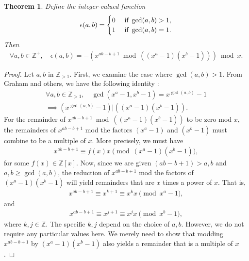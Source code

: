 \documentclass{article}
\theoremstyle{plain}
\newtheorem{theorem}{Theorem}
\theoremstyle{definition}
\newcommand{\coprime}{\epsilon}
\newcommand{\Z}{\mathbb{Z}}
\begin{document}
\begin{theorem} \label{proof:coprimalityfunctionpoly}
Define the integer-valued function
\begin{align*}
\coprime(a,b) =
\begin{cases}
    0 & \textup{ if } \gcd(a,b) > 1 , \\
    1 & \textup{ if } \gcd(a,b) = 1 .
\end{cases}
\end{align*}
Then
\begin{align*}
\forall a,b \in \Z^+, \quad
\coprime(a,b) = -\left(x^{ab-b+1} \bmod \left((x^a-1)(x^b-1)\right)\right) \bmod x .
\end{align*}
\end{theorem}
\begin{proof}
Let $a,b$ in $\Z_{>1}$. First, we examine the case where $\gcd(a,b) > 1$. From Graham and others, we have the following identity \cite{graham1994concrete}:
\begin{align*}
\forall a,b \in \Z_{>1}, \quad
\gcd(x^a-1,x^b-1) = x^{\gcd(a,b)} - 1 \\
\implies (x^{\gcd(a,b)}-1) | \left( (x^a-1)(x^b-1) \right).
\end{align*}
For the remainder of $x^{ab-b+1} \bmod \left((x^a-1)(x^b-1)\right)$ to be zero mod $x$, the remainders of $x^{ab-b+1}$ mod the factors $(x^a-1)$ and $(x^b-1)$ must combine to be a multiple of $x$. More precisely, we must have
\begin{align*}
    x^{ab-b+1} \equiv f(x) x \pmod{(x^a-1)(x^b-1)} , 
\end{align*}
for some $f(x) \in \Z[x]$.
Now, since we are given $(ab-b+1) > a,b$ and $a,b \geq \gcd(a,b)$, the reduction of $x^{ab-b+1}$ mod the factors of $(x^a-1)(x^b-1)$ will yield remainders that are $x$ times a power of $x$. That is,
\begin{align*}
    x^{ab-b+1} \equiv x^{k+1} \equiv x^k x \pmod{x^a-1} ,
\end{align*}
and
\begin{align*}
    x^{ab-b+1} \equiv x^{j+1} \equiv x^j x \pmod{x^b-1} ,
\end{align*}
where $k,j \in \Z$. The specific $k,j$ depend on the choice of $a,b$. However, we do not require any particular values here. We merely need to show that modding $x^{ab-b+1}$ by $(x^a-1)(x^b-1)$ also yields a remainder that is a multiple of $x$.


\end{proof}
\end{document}
